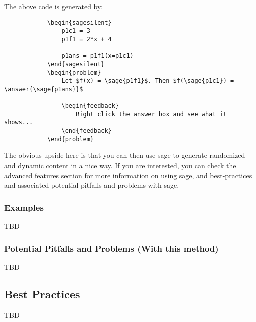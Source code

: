 \documentclass{ximera}
\begin{document}
        The above code is generated by:
        
        \begin{verbatim}
            \begin{sagesilent}
                p1c1 = 3
                p1f1 = 2*x + 4
                
                p1ans = p1f1(x=p1c1)
            \end{sagesilent}
            \begin{problem}
                Let $f(x) = \sage{p1f1}$. Then $f(\sage{p1c1}) = \answer{\sage{p1ans}}$
                
                \begin{feedback}
                    Right click the answer box and see what it shows...
                \end{feedback}
            \end{problem}
        \end{verbatim}
        
        The obvious upside here is that you can then use sage to generate randomized and dynamic content in a nice way. If you are interested, you can check the advanced features section for more information on using sage, and best-practices and associated potential pitfalls and problems with sage.


    \subsubsection*{Examples}
    
        TBD
        
    \subsubsection*{Potential Pitfalls and Problems (With this method)}
    
        TBD
    
    \subsection*{Best Practices}
    
        TBD
        

    
\end{document}

